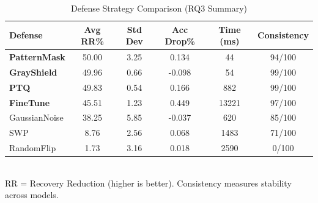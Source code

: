 \begin{table}[t]
\centering
\caption{Defense Strategy Comparison (RQ3 Summary)}
\label{tab:defense_comparison}
\begin{tabular}{lccccc}
\toprule
\textbf{Defense} & \textbf{Avg RR\%} & \textbf{Std Dev} & \textbf{Acc Drop\%} & \textbf{Time (ms)} & \textbf{Consistency} \\
\midrule
\textbf{PatternMask} & 50.00 & 3.25 & 0.134 & 44 & 94/100 \\
\textbf{GrayShield} & 49.96 & 0.66 & -0.098 & 54 & 99/100 \\
\textbf{PTQ} & 49.83 & 0.54 & 0.166 & 882 & 99/100 \\
\textbf{FineTune} & 45.51 & 1.23 & 0.449 & 13221 & 97/100 \\
GaussianNoise & 38.25 & 5.85 & -0.037 & 620 & 85/100 \\
SWP & 8.76 & 2.56 & 0.068 & 1483 & 71/100 \\
RandomFlip & 1.73 & 3.16 & 0.018 & 2590 & 0/100 \\
\bottomrule
\end{tabular}
\vspace{0.1cm}
\\
\footnotesize{RR = Recovery Reduction (higher is better). Consistency measures stability across models.}
\end{table}